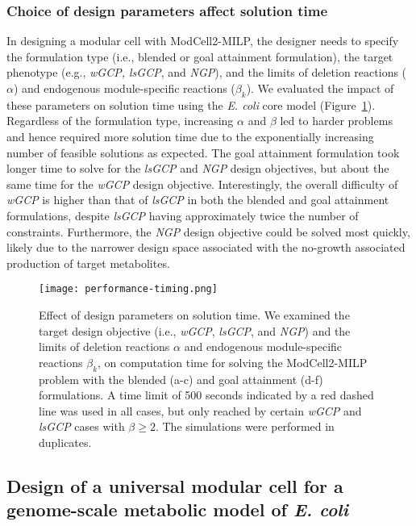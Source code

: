 \subsubsection{Choice of design parameters affect solution time}
In designing a modular cell with ModCell2-MILP, the designer needs to specify the formulation type (i.e., blended or goal attainment formulation), the target phenotype (e.g., \textit{wGCP, lsGCP}, and \textit{NGP}), and the limits of deletion reactions ($\alpha$) and endogenous module-specific reactions ($\beta_{k}$). We evaluated the impact of these parameters on solution time using the \textit{E. coli} core model (Figure~\ref{fig5:times}).  Regardless of the formulation type, increasing $\alpha$ and $\beta$ led to harder problems and hence required more solution time due to the exponentially increasing number of feasible solutions as expected. The goal attainment formulation took longer time to solve for the \textit{lsGCP} and \textit{NGP} design objectives, but about the same time for the \textit{wGCP} design objective. Interestingly, the overall difficulty of \textit{wGCP} is higher than that of \textit{lsGCP} in both the blended and goal attainment formulations, despite \textit{lsGCP} having approximately twice the number of constraints. Furthermore, the \textit{NGP} design objective could be solved most quickly, likely due to the narrower design space associated with the no-growth associated production of target metabolites.

\begin{figure}[hp]
    \centering
    \texttt{[image: performance-timing.png]}
    \caption[Effect of design parameters on solution time]{Effect of design parameters on solution time. We examined the target design objective (i.e., \textit{wGCP}, \textit{lsGCP}, and \textit{NGP}) and the limits of deletion reactions $\alpha$ and endogenous module-specific reactions $\beta_k$, on computation time for solving the ModCell2-MILP problem with the blended (a-c) and goal attainment (d-f) formulations. A time limit of 500 seconds indicated by a red dashed line was used in all cases, but only reached by certain \textit{wGCP} and \textit{lsGCP} cases with $\beta \ge2$. The simulations were performed in duplicates.}
    \label{fig5:times}
\end{figure}

\subsection{Design of a universal modular cell for a genome-scale metabolic model of \textit{E. coli}} \label{sec:univ_design}


